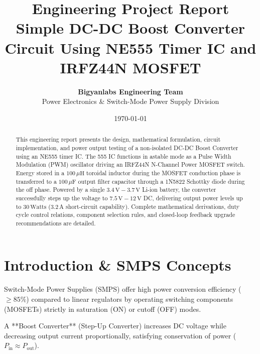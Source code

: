 \documentclass[11pt,a4paper]{article}
\title{\textbf{\Huge Engineering Project Report}\\[0.5em] \Large Simple DC-DC Boost Converter Circuit Using NE555 Timer IC and IRFZ44N MOSFET}
\author{\textbf{Bigyanlabs Engineering Team}\\ Power Electronics \& Switch-Mode Power Supply Division}
\date{\today}
\begin{document}
\maketitle
\thispagestyle{empty}

\begin{abstract}
This engineering report presents the design, mathematical formulation, circuit implementation, and power output testing of a non-isolated DC-DC Boost Converter using an NE555 timer IC. The 555 IC functions in astable mode as a Pulse Width Modulation (PWM) oscillator driving an IRFZ44N N-Channel Power MOSFET switch. Energy stored in a $100\,\mu\text{H}$ toroidal inductor during the MOSFET conduction phase is transferred to a $100\,\mu\text{F}$ output filter capacitor through a 1N5822 Schottky diode during the off phase. Powered by a single $3.4\,\text{V} - 3.7\,\text{V}$ Li-ion battery, the converter successfully steps up the voltage to $7.5\,\text{V} - 12\,\text{V}$ DC, delivering output power levels up to $30\,\text{Watts}$ ($3.2\,\text{A}$ short-circuit capability). Complete mathematical derivations, duty cycle control relations, component selection rules, and closed-loop feedback upgrade recommendations are detailed.
\end{abstract}

\newpage
\tableofcontents
\newpage

\section{Introduction \& SMPS Concepts}
Switch-Mode Power Supplies (SMPS) offer high power conversion efficiency ($\ge 85\%$) compared to linear regulators by operating switching components (MOSFETs) strictly in saturation (ON) or cutoff (OFF) modes.

A **Boost Converter** (Step-Up Converter) increases DC voltage while decreasing output current proportionally, satisfying conservation of power ($P_{\text{in}} \approx P_{\text{out}}$).
\end{document}
